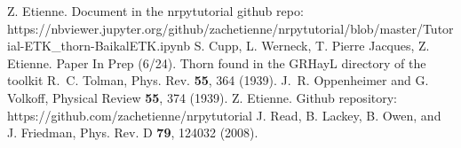 \begin{thebibliography}{9}
Z. Etienne. Document in the nrpytutorial github repo: https://nbviewer.jupyter.org/github/zachetienne/nrpytutorial/blob/master/Tutorial-ETK\_thorn-BaikalETK.ipynb
%
S. Cupp, L. Werneck, T. Pierre Jacques, Z. Etienne. Paper In Prep (6/24). Thorn found in the GRHayL directory of the toolkit
%
R.~C. Tolman, Phys. Rev. {\bf 55}, 364 (1939).
%
J.~R. Oppenheimer and G. Volkoff, Physical Review {\bf 55}, 374 (1939).
%
Z. Etienne. Github repository: https://github.com/zachetienne/nrpytutorial
%
J. Read, B. Lackey, B. Owen, and J. Friedman, Phys. Rev. D {\bf 79}, 124032 (2008).
%
\end{thebibliography}



